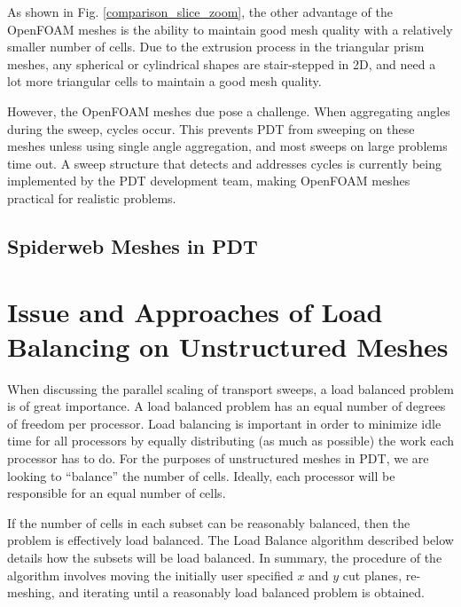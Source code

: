 \documentclass[11pt, letterpaper,titlepage,oneside]{article}
\begin{document}
As shown in Fig. \ref{comparison_slice_zoom}, the other advantage of the OpenFOAM meshes is the ability to maintain good mesh quality with a relatively smaller number of cells. Due to the extrusion process in the triangular prism meshes, any spherical or cylindrical shapes are stair-stepped in 2D, and need a lot more triangular cells to maintain a good mesh quality.

However, the OpenFOAM meshes due pose a challenge. When aggregating angles during the sweep, cycles occur. This prevents PDT from sweeping on these meshes unless using single angle aggregation, and most sweeps on large problems time out. A sweep structure that detects and addresses cycles is currently being implemented by the PDT development team, making OpenFOAM meshes practical for realistic problems.

\subsection{Spiderweb Meshes in PDT}

\section{Issue and Approaches of Load Balancing on Unstructured Meshes}

When discussing the parallel scaling of transport sweeps, a load balanced problem is of great importance. A load balanced problem has an equal number of degrees of freedom per processor. Load balancing is important in order to minimize idle time for all processors by equally distributing (as much as possible) the work each processor has to do.  For the purposes of unstructured meshes in PDT, we are looking to ``balance'' the number of cells. Ideally, each processor will be responsible for an equal number of cells. 

If the number of cells in each subset can be reasonably balanced, then the problem is effectively load balanced. The Load Balance algorithm described below details how the subsets will be load balanced. In summary, the procedure of the algorithm involves moving the initially user specified $x$ and $y$ cut planes, re-meshing, and iterating until a reasonably load balanced problem is obtained. 
\end{document}
